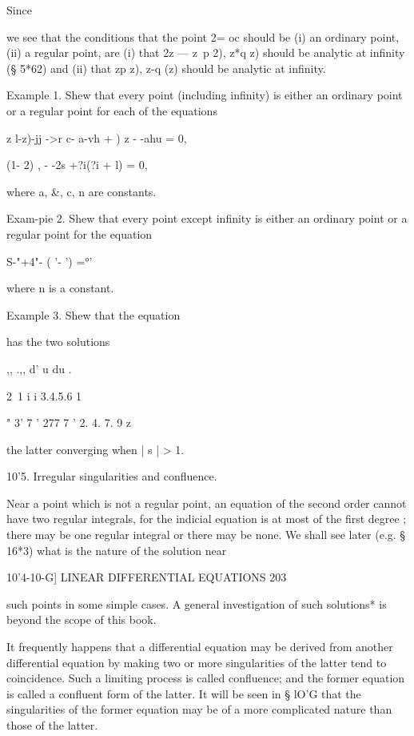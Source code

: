 Since 

we see that the conditions that the point 2= oc should be (i) an ordinary 
point, (ii) a regular point, are (i) that 2z — z~p  2), z*q z) should be analytic 
at infinity (§ 5*62) and (ii) that zp  z), z-q (z) should be analytic at infinity. 

Example 1. Shew that every point (including infinity) is either an ordinary point or 
a regular point for each of the equations 

z l-z)-jj ->r c- a-vh +  ) z - -ahu = 0, 

(1- 2) , - -2s +?i(?i + l)  = 0, 

where a, \&, c, n are constants. 

Exam-pie 2. Shew that every point except infinity is either an ordinary point or a 
regular point for the equation 



 S-"+4"- ( '- ') =°' 



where n is a constant. 



Example 3. Shew that the equation 



has the two solutions 



,, .,, d' u   du  .   

2\  1 i  i 3.4.5.6 1 

 " 3' 7 '  277 7 '  2. 4. 7. 9 z  



the latter converging when | s | > 1. 

10'5. Irregular singularities and confluence. 

Near a point which is not a regular point, an equation of the second order 
cannot have two regular integrals, for the indicial equation is at most of 
the first degree ; there may be one regular integral or there may be none. 
We shall see later (e.g. § 16*3) what is the nature of the solution near 



10'4-10-G] LINEAR DIFFERENTIAL EQUATIONS 203 

such points in some simple cases. A general investigation of such solutions* 
is beyond the scope of this book. 

It frequently happens that a differential equation may be derived from 
another differential equation by making two or more singularities of the 
latter tend to coincidence. Such a limiting process is called confluence; 
and the former equation is called a confluent form of the latter. It will be 
seen in § lO'G that the singularities of the former equation may be of a more 
complicated nature than those of the latter. 

